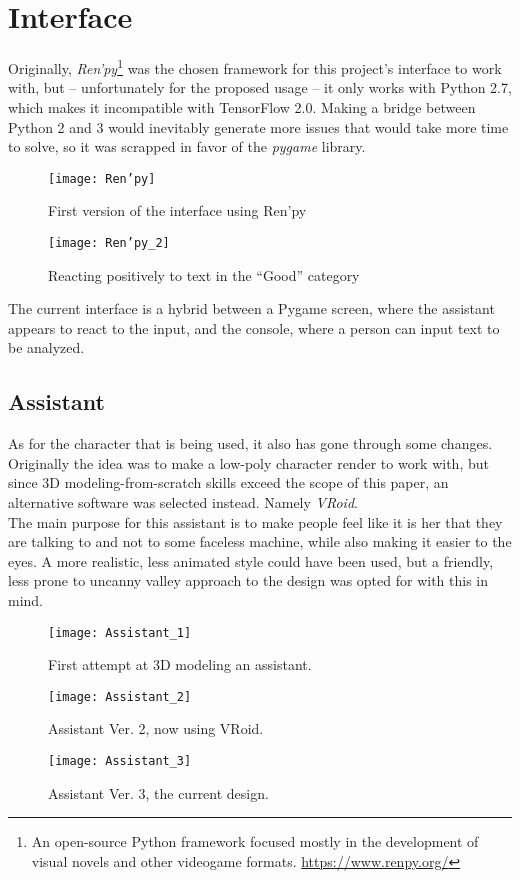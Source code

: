 \section{Interface}
Originally, \textit{Ren'py}\footnote{An open-source Python framework focused mostly in the development of visual novels and other videogame formats. \url{https://www.renpy.org/}} was the chosen framework for this project's interface to work with, but -- unfortunately for the proposed usage -- it only works with Python 2.7, which makes it incompatible with TensorFlow 2.0. Making a bridge between Python 2 and 3 would inevitably generate more issues that would take more time to solve, so it was scrapped in favor of the \textit{pygame} library.
\pagebreak

\begin{figure}[!h]
	\centering
	\texttt{[image: Ren'py]}
	\caption{First version of the interface using Ren'py}
	\label{fig:renpy_test_1}
\end{figure}
\begin{figure}[!h]
	\centering
	\texttt{[image: Ren'py\_2]}
	\caption{Reacting positively to text in the ``Good'' category}
	\label{fig:renpy_test_2}
\end{figure}

The current interface is a hybrid between a Pygame screen, where the assistant appears to react to the input, and the console, where a person can input text to be analyzed.
\pagebreak

\subsection{Assistant}
As for the character that is being used, it also has gone through some changes. Originally the idea was to make a low-poly character render to work with, but since 3D modeling-from-scratch skills exceed the scope of this paper, an alternative software was selected instead. Namely \textit{VRoid}.\\
The main purpose for this assistant is to make people feel like it is her that they are talking to and not to some faceless machine, while also making it easier to the eyes. A more realistic, less animated style could have been used, but a friendly, less prone to uncanny valley approach to the design was opted for with this in mind.
\begin{figure}[!ht]
	\centering
	\texttt{[image: Assistant\_1]}
	\caption{First attempt at 3D modeling an assistant.}
	\label{fig:assistant1}
\end{figure}
\begin{figure}[!ht]
	\centering
	\texttt{[image: Assistant\_2]}
	\caption{Assistant Ver. 2, now using VRoid.}
	\label{fig:assistant2}
\end{figure}
\begin{figure}[!ht]
	\centering
	\texttt{[image: Assistant\_3]}
	\caption{Assistant Ver. 3, the current design.}
	\label{fig:assistant3}
\end{figure}


